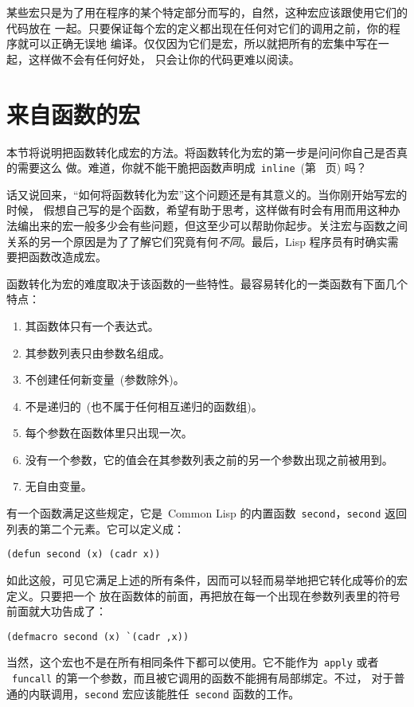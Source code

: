 某些宏只是为了用在程序的某个特定部分而写的，自然，这种宏应该跟使用它们的代码放在
一起。只要保证每个宏的定义都出现在任何对它们的调用之前，你的程序就可以正确无误地
编译。仅仅因为它们是宏，所以就把所有的宏集中写在一起，这样做不会有任何好处，
只会让你的代码更难以阅读。

\section{来自函数的宏}
\label{sec:macros_from_functions}

本节将说明把函数转化成宏的方法。将函数转化为宏的第一步是问问你自己是否真的需要这么
做。难道，你就不能干脆把函数声明成~\verb|inline|~(第~\pageref{page:inline_50th} 页)
吗？

话又说回来，“如何将函数转化为宏”这个问题还是有其意义的。当你刚开始写宏的时候，
假想自己写的是个函数，希望有助于思考，这样做有时会有用\pozhehao{}而用这种办法编出来的宏一般多少会有些问题，但这至少可以帮助你起步。关注宏与函数之间关系的另一个原因是为了了解它们究竟有何\emph{不同}。最后，Lisp 程序员有时确实需要把函数改造成宏。

函数转化为宏的难度取决于该函数的一些特性。最容易转化的一类函数有下面几个特点：
\begin{enumerate}
 \item \label{itm:body-expression}其函数体只有一个表达式。
 \item \label{itm:param-name}其参数列表只由参数名组成。
 \item \label{itm:no-newvar}不创建任何新变量~(参数除外)。
 \item \label{itm:no-recursive}不是递归的~(也不属于任何相互递归的函数组)。
 \item \label{itm:param-1}每个参数在函数体里只出现一次。
 \item \label{itm:param-used}没有一个参数，它的值会在其参数列表之前的另一个参数出现之前被用到。
 \item \label{itm:no-freevar}无自由变量。
\end{enumerate}

有一个函数满足这些规定，它是~Common Lisp 的内置函数~\texttt{second}，\texttt{second} 返回列表的第二个元素。它可以定义成：
\begin{lstlisting}
(defun second (x) (cadr x))
\end{lstlisting}
如此这般，可见它满足上述的所有条件，因而可以轻而易举地把它转化成等价的宏定义。只要把一个\bq{}
放在函数体的前面，再把\comma{}放在每一个出现在参数列表里的符号前面就大功告成了：
\begin{lstlisting}
(defmacro second (x) `(cadr ,x))
\end{lstlisting}
当然，这个宏也不是在所有相同条件下都可以使用。它不能作为~\texttt{apply} 或者
~\texttt{funcall} 的第一个参数，而且被它调用的函数不能拥有局部绑定。不过，
对于普通的内联调用，\texttt{second} 宏应该能胜任~\texttt{second} 函数的工作。

